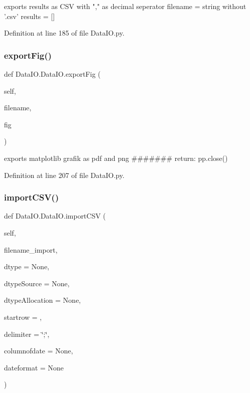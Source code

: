 \begin{DoxyVerb}exports results as CSV with "," as decimal seperator
filename = string without '.csv'
results = []
\end{DoxyVerb}
 

Definition at line 185 of file Data\+I\+O.\+py.

\mbox{\label{class_data_i_o_1_1_data_i_o_a4929b9de8bce15ad8e1fc432eb5167f9}} 
\subsubsection{\texorpdfstring{export\+Fig()}{exportFig()}}
{\footnotesize\ttfamily def Data\+I\+O.\+Data\+I\+O.\+export\+Fig (\begin{DoxyParamCaption}\item[{}]{self,  }\item[{}]{filename,  }\item[{}]{fig }\end{DoxyParamCaption})}

\begin{DoxyVerb}exports matplotlib grafik as pdf and png\n
#######\n
return:\n
    pp.close()
\end{DoxyVerb}
 

Definition at line 207 of file Data\+I\+O.\+py.

\mbox{\label{class_data_i_o_1_1_data_i_o_aa79466ed985916b447e97c1b501ff30c}} 
\subsubsection{\texorpdfstring{import\+C\+S\+V()}{importCSV()}}
{\footnotesize\ttfamily def Data\+I\+O.\+Data\+I\+O.\+import\+C\+SV (\begin{DoxyParamCaption}\item[{}]{self,  }\item[{}]{filename\+\_\+import,  }\item[{}]{dtype = {\ttfamily None},  }\item[{}]{dtype\+Source = {\ttfamily None},  }\item[{}]{dtype\+Allocation = {\ttfamily None},  }\item[{}]{startrow = {},  }\item[{}]{delimiter = {\ttfamily \char`\"{};\char`\"{}},  }\item[{}]{columnofdate = {\ttfamily None},  }\item[{}]{dateformat = {\ttfamily None} }\end{DoxyParamCaption})}

